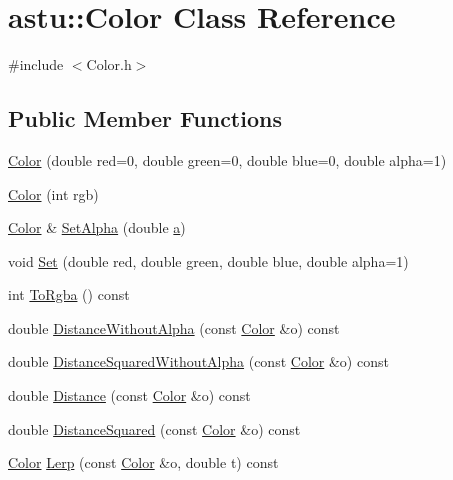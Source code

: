 \hypertarget{classastu_1_1Color}{}\section{astu\+:\+:Color Class Reference}
\label{classastu_1_1Color}


{\ttfamily \#include $<$Color.\+h$>$}

\subsection*{Public Member Functions}
\begin{DoxyCompactItemize}
\item 
\hyperlink{classastu_1_1Color_a3b4505ef24790685a5e22bde22ff5b05}{Color} (double red=0, double green=0, double blue=0, double alpha=1)
\item 
\hyperlink{classastu_1_1Color_a5056ade3f6bf10a72056ffcb3d2e1f42}{Color} (int rgb)
\item 
\hyperlink{classastu_1_1Color}{Color} \& \hyperlink{classastu_1_1Color_afdc4eaa4609f192757c8cfa6ec51f110}{Set\+Alpha} (double \hyperlink{classastu_1_1Color_a001a2dcf8f1f0d4abb97f8c158bfddec}{a})
\item 
void \hyperlink{classastu_1_1Color_a709d6f647c38187f1d4028810dfa363e}{Set} (double red, double green, double blue, double alpha=1)
\item 
int \hyperlink{classastu_1_1Color_aa9ad15d1137f9a6243373a687faa101c}{To\+Rgba} () const
\item 
double \hyperlink{classastu_1_1Color_a2a897cfc4a5706a7c3ab8562adb217d8}{Distance\+Without\+Alpha} (const \hyperlink{classastu_1_1Color}{Color} \&o) const
\item 
double \hyperlink{classastu_1_1Color_a04fc869504fd1f14d4c27d257ac0a121}{Distance\+Squared\+Without\+Alpha} (const \hyperlink{classastu_1_1Color}{Color} \&o) const
\item 
double \hyperlink{classastu_1_1Color_a53b134d44a2fba57ed560f00ce55a471}{Distance} (const \hyperlink{classastu_1_1Color}{Color} \&o) const
\item 
double \hyperlink{classastu_1_1Color_af57011227eea623101859b95127e364c}{Distance\+Squared} (const \hyperlink{classastu_1_1Color}{Color} \&o) const
\item 
\hyperlink{classastu_1_1Color}{Color} \hyperlink{classastu_1_1Color_a0dc0303a14adf0712e12e756bde1b365}{Lerp} (const \hyperlink{classastu_1_1Color}{Color} \&o, double t) const
\item 

\end{DoxyCompactItemize}
